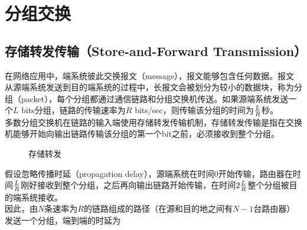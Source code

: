 \newpage

\section{分组交换}

\subsection{存储转发传输（Store-and-Forward Transmission）}

在网络应用中，端系统彼此交换报文（message），报文能够包含任何数据。报文从源端系统发送到目的端系统的过程中，长报文会被划分为较小的数据块，称为分组（packet），每个分组都通过通信链路和分组交换机传送。如果源端系统发送一个$ L $ bits分组，链路的传输速率为$ R $ bits/sec，则传输该分组的时间为$ L \over R $秒。\\

多数分组交换机在链路的输入端使用存储转发传输机制，存储转发传输是指在交换机能够开始向输出链路传输该分组的第一个bit之前，必须接收到整个分组。\\

\begin{figure}[H]
    \centering
    \caption{存储转发}
\end{figure}

假设忽略传播时延（propagation delay），源端系统在时间0开始传输，路由器在时间$ L \over R $刚好接收到整个分组，之后再向输出链路开始传输，在时间$ 2 {L \over R} $整个分组被目的端系统接收。\\

因此，由$ N $条速率为$ R $的链路组成的路径（在源和目的地之间有$ N - 1 $台路由器）发送一个分组，端到端的时延为

\vspace{-0.5cm}

